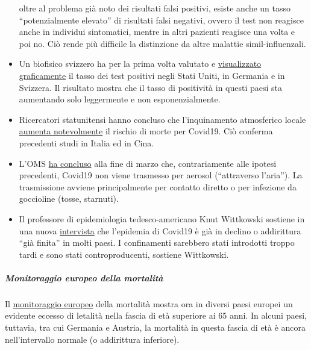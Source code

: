 \begin{itemize}
  oltre al problema già noto dei risultati falsi positivi, esiste anche
  un tasso ``potenzialmente elevato'' di risultati falsi negativi,
  ovvero il test non reagisce anche in individui sintomatici, mentre in
  altri pazienti reagisce una volta e poi no. Ciò rende più difficile la
  distinzione da altre malattie simil-influenzali.
\item
  Un biofisico svizzero ha per la prima volta valutato e
  \href{https://swprs.org/rate-of-positive-covid19-tests/}{visualizzato
  graficamente} il tasso dei test positivi negli Stati Uniti, in
  Germania e in Svizzera. Il risultato mostra che il tasso di positività
  in questi paesi sta aumentando solo leggermente e non
  esponenzialmente.
\item
   Ricercatori statunitensi hanno concluso che l'inquinamento
  atmosferico locale
  \href{https://www.heise.de/tp/features/Luftverschmutzung-erhoeht-Covid-19-Sterberisiko-4699306.html}{aumenta
  notevolmente} il rischio di morte per Covid19. Ciò conferma precedenti
  studi in Italia ed in Cina.
\item
  L'OMS
  \href{https://www.who.int/news-room/commentaries/detail/modes-of-transmission-of-virus-causing-covid-19-implications-for-ipc-precaution-recommendations}{ha
  concluso} alla fine di marzo che, contrariamente alle ipotesi
  precedenti, Covid19 non viene trasmesso per aerosol (``attraverso
  l'aria''). La trasmissione avviene principalmente per contatto diretto
  o per infezione da goccioline (tosse, starnuti).
\item
  Il professore di epidemiologia tedesco-americano Knut Wittkowski
  sostiene in una nuova
  \href{https://www.youtube.com/watch?v=ARTf4bpiXuI}{intervista} che
  l'epidemia di Covid19 è già in declino o addirittura ``già finita'' in
  molti paesi. I confinamenti sarebbero stati introdotti troppo tardi e
  sono stati controproducenti, sostiene Wittkowski.\\
\end{itemize}

\hypertarget{monitoraggio-europeo-della-mortalituxe0}{%
\subparagraph{\texorpdfstring{\textbf{Monitoraggio europeo della
mortalità}}{Monitoraggio europeo della mortalità}}\label{monitoraggio-europeo-della-mortalituxe0}}

Il
\href{https://www.euromomo.eu/outputs/zscore_country_total.html}{monitoraggio
europeo} della mortalità mostra ora in diversi paesi europei un evidente
eccesso di letalità nella fascia di età superiore ai 65 anni. In alcuni
paesi, tuttavia, tra cui Germania e Austria, la mortalità in questa
fascia di età è ancora nell'intervallo normale (o addirittura
inferiore).

